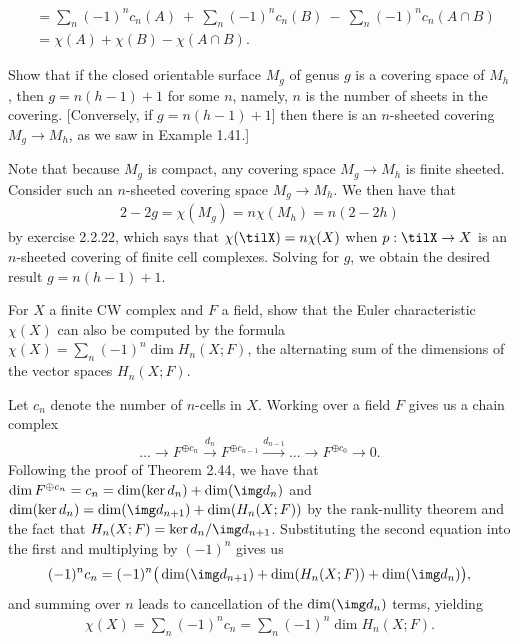 \begin{homework}[e]
\begin{prf}
\begin{align*}
      &= \sum_n(-1)^nc_n(A)~+~\sum_n(-1)^nc_n(B)~-~\sum_n(-1)^nc_n(A\cap B) \\
      &= \chi(A) + \chi(B) - \chi(A\cap B).
    \end{align*}
  \end{prf}
   Show that if the closed orientable surface $M_g$ of genus $g$ is a covering space of $M_h$, then $g = n(h-1) + 1$ for some $n$, namely, $n$ is the number of sheets in the covering. [Conversely, if $g = n(h-1) + 1$] then there is an $n$-sheeted covering $M_g\to M_h$, as we saw in Example 1.41.]
  \begin{prf}
    Note that because $M_g$ is compact, any covering space $M_g\to M_h$ is finite sheeted. Consider such an $n$-sheeted covering space $M_g\to M_h$. We then have that
    \begin{align*}
      2 - 2g = \chi(M_g) = n\chi(M_h) = n(2 - 2h)
    \end{align*}
    by exercise 2.2.22, which says that $\chi(\tilX) = n\chi(X)$ when $p:\tilX\to X$ is an $n$-sheeted covering of finite cell complexes. Solving for $g$, we obtain the desired result $g = n(h - 1) + 1$.
  \end{prf}
   For $X$ a finite CW complex and $F$ a field, show that the Euler characteristic $\chi(X)$ can also be computed by the formula $\chi(X) = \sum_n(-1)^n \dim H_n(X;F)$, the alternating sum of the dimensions of the vector spaces $H_n(X;F)$.
  \begin{prf}
    Let $c_n$ denote the number of $n$-cells in $X$. Working over a field $F$ gives us a chain complex
    \begin{align*}
      ...\to F^{\oplus c_n} \xrightarrow{d_n} F^{\oplus c_{n-1}} \xrightarrow{d_{n-1}} ... \to F^{\oplus c_0} \to 0.
    \end{align*}
    Following the proof of Theorem 2.44, we have that $\dim F^{\oplus c_n} = c_n = \dim(\ker d_n) + \dim (\img d_{n})$ and $\dim(\ker d_n) = \dim(\img d_{n+1}) + \dim(H_n(X;F))$ by the rank-nullity theorem and the fact that $H_n(X;F) = \ker d_n/\img d_{n+1}$. Substituting the second equation into the first and multiplying by $(-1)^n$ gives us
    \begin{align*}
      (-1)^{n} c_n = (-1)^{n}\big(\dim(\img d_{n+1}) + \dim(H_n(X;F)) + \dim(\img d_n)\big),
    \end{align*}
    and summing over $n$ leads to cancellation of the $\dim(\img d_n)$ terms, yielding
    \begin{align*}
      \chi(X) = \sum_n(-1)^n c_n = \sum_n (-1)^n \dim H_n(X;F).
    \end{align*}
  \end{prf}
\end{homework}
